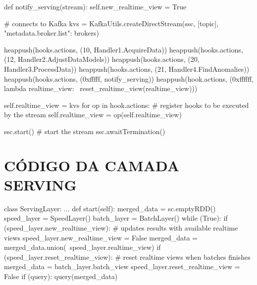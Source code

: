 \begin{apendicesenv}
\begin{python}
        def notify_serving(stream):
            self.new_realtime_view = True

        # connects to Kafka
        kvs = KafkaUtils.createDirectStream(ssc, [topic], \\
            {"metadata.broker.list": brokers})

        heappush(hooks.actions, (10, Handler1.AcquireData))
        heappush(hooks.actions, (12, Handler2.AdjustDataModels))
        heappush(hooks.actions, (20, Handler3.ProcessData))
        heappush(hooks.actions, (21, Handler4.FindAnomalies))
        heappush(hooks.actions, (0xfffff, notify_serving))
        heappush(hook.actions, (0xffffff, lambda realtime_view: \
            reset_realtime_view(realtime_view)))

        self.realtime_view = kvs
        for op in hook.actions:
              # register hooks to be executed by the stream
              self.realtime_view = op(self.realtime_view)

        ssc.start() # start the stream
        ssc.awaitTermination()

\end{python}

\section{CÓDIGO DA CAMADA SERVING}
\begin{python}
class ServingLayer:
    ...
    def start(self):
        merged_data = sc.emptyRDD()
        speed_layer = SpeedLayer()
        batch_layer = BatchLayer()
        while (True):
            if (speed_layer.new_realtime_view):
                # updates results with available realtime views
                speed_layer.new_realtime_view = False
                merged_data = merged_data.union(\
                    speed_layer.realtime_view)
            if (speed_layer.reset_realtime_view):
                # reset realtime views when batches finishes
                merged_data = batch_layer.batch_view
                speed_layer.reset_realtime_view = False
            if (query):
                query(merged_data)
\end{python}

\end{apendicesenv}

